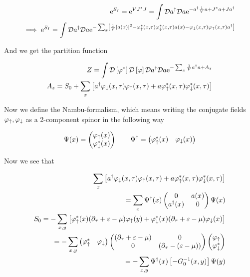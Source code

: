\begin{align}
    \mathrm{e}^{S_I} = \mathrm{e}^{VJ^*J} =  \int \mathcal{D} a^{\dagger} \mathcal{D} a \mathrm{e}^{-a^{\dagger} \frac{1}{V}a + J^*a + Ja^{\dagger}} \\ 
    \implies \mathrm{e}^{S_{I}} =  \int \mathcal{D} a^{\dagger} \mathcal{D} a \mathrm{e}^{-\sum_x \left[\frac{1}{V} \abs{a(x)}^{2} - \varphi_\uparrow^*(x,\tau) \varphi_\downarrow^*(x,\tau)a(x) - \varphi_\downarrow(x,\tau) \varphi_\uparrow(x, \tau)a^{\dagger} \right]} 
\end{align}

And we get the partition function 

\begin{align*}
    Z = \int \mathcal{D} \left[ \varphi^*\right] \mathcal{D} \left[\varphi\right]\mathcal{D} a^{\dagger} \mathcal{D} a \mathrm{e}^{-\sum_x \frac{1}{V}a^{\dagger} a + A_z} \\ 
    A_z = S_0 + \sum_x \left[ a^{\dagger} \varphi_\downarrow(x,\tau) \varphi_\uparrow(x, \tau) + a \varphi_\uparrow^*(x,\tau) \varphi_\downarrow^*(x,\tau) \right]
\end{align*}

Now we define the Nambu-formalism, which means writing the conjugate fields $\varphi_\uparrow, \varphi_\downarrow$ as a 2-component spinor in the following way 

\begin{align*}
    \Psi(x) = \begin{pmatrix}\varphi_\uparrow(x) \\ \varphi_\downarrow^*(x) \end{pmatrix} \quad \quad \Psi^{\dagger} = \begin{pmatrix}\varphi_\uparrow^*(x) & \varphi_\downarrow(x)\end{pmatrix}
\end{align*}

Now we see that 

\begin{align*}
    \sum_x \left[ a^{\dagger} \varphi_\downarrow(x,\tau) \varphi_\uparrow(x, \tau) + a \varphi_\uparrow^*(x,\tau) \varphi_\downarrow^*(x,\tau) \right] \\ 
    = \sum_x \Psi^{\dagger} (x) \begin{pmatrix} 0 & a(x) \\ a^{\dagger}(x) & 0 \end{pmatrix} \Psi(x) \\ 
    S_0 = -\sum_{x,y} \left[ \varphi_\uparrow^*(x)(\partial_\tau + \varepsilon - \mu)\varphi_\uparrow(y) + \varphi_\downarrow^*(x)(\partial_\tau +\varepsilon - \mu)\varphi_\downarrow(x)\right] \\ 
    = -\sum_{x,y} \begin{pmatrix}\varphi_\uparrow^* & \varphi_\downarrow\end{pmatrix} \begin{pmatrix}(\partial_\tau + \varepsilon - \mu)  & 0 \\ 0 & (\partial_\tau -(\varepsilon - \mu)) \end{pmatrix} \begin{pmatrix}\varphi_\uparrow \\ \varphi_\downarrow^* \end{pmatrix} \\ 
    = -\sum_{x,y} \Psi^{\dagger}(x) \left[ -G_0 ^{-1}(x,y) \right] \Psi(y) 
\end{align*}

